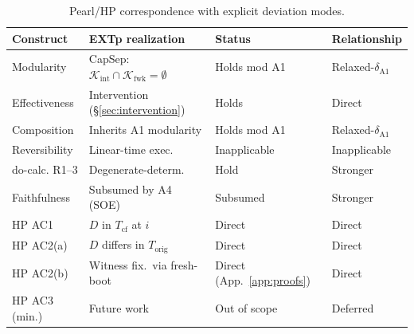 \documentclass[conference]{IEEEtran}
\newcommand{\Korig}{T_\text{orig}}
\newcommand{\Tcf}{T_\text{cf}}
\newcommand{\Kint}{\mathcal{K}_\text{int}}
\newcommand{\Kfwk}{\mathcal{K}_\text{fwk}}
\begin{document}
\begin{table}[t]
  \caption{Pearl/HP correspondence with explicit deviation modes.}
  \label{tab:pearl}
  \centering
  \footnotesize
  \begin{tabular}{@{}p{}p{}p{}p{}@{}}
  \toprule
  Construct & EXTp realization & Status & Relationship \\
  \midrule
  Modularity      & CapSep: $\Kint \cap \Kfwk = \emptyset$ & Holds mod A1     & Relaxed-$\delta_{\text{A1}}$ \\
  Effectiveness   & Intervention (\S\ref{sec:intervention})       & Holds            & Direct \\
  Composition     & Inherits A1 modularity         & Holds mod A1     & Relaxed-$\delta_{\text{A1}}$ \\
  Reversibility   & Linear-time exec.              & Inapplicable     & Inapplicable \\
  do-calc. R1--3  & Degenerate-determ.             & Hold             & Stronger \\
  Faithfulness    & Subsumed by A4 (SOE)           & Subsumed         & Stronger \\
  HP AC1          & $D$ in $\Tcf$ at $i$           & Direct           & Direct \\
  HP AC2(a)       & $D$ differs in $\Korig$        & Direct           & Direct \\
  HP AC2(b)       & Witness fix.\ via fresh-boot   & Direct (App.~\ref{app:proofs}) & Direct \\
  HP AC3 (min.)   & Future work                    & Out of scope     & Deferred \\
  \bottomrule
  \end{tabular}
\end{table}
\end{document}

